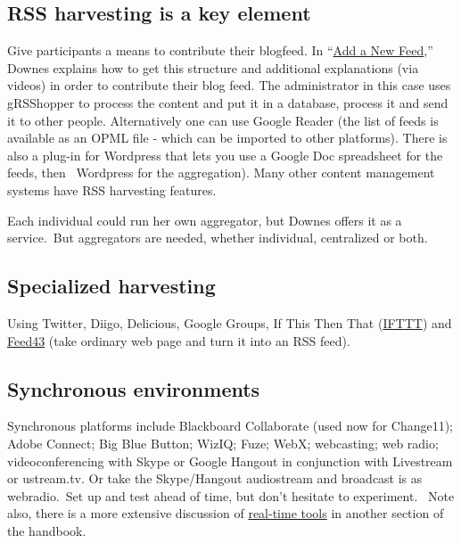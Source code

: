 \hypertarget{rss-harvesting-is-a-key-element}{%
\subsection{RSS harvesting is a key
element}\label{rss-harvesting-is-a-key-element}}

Give participants a means to contribute their blogfeed. In
``\href{http://change.mooc.ca/new_feed.htm}{Add a New Feed},'' Downes
explains how to get this structure and additional explanations (via
videos) in order to contribute their blog feed. The administrator in
this case uses gRSShopper to process the content and put it in a
database, process it and send it to other people. Alternatively one can
use Google Reader (the list of feeds is available as an OPML file -
which can be imported to other platforms). There is also a plug-in for
Wordpress that lets you use a Google Doc spreadsheet for the feeds, then
~Wordpress for the aggregation). Many other content management systems
have RSS harvesting features.

Each individual could run her own aggregator, but Downes offers it as a
service.~But aggregators are needed, whether individual, centralized or
both.

\hypertarget{specialized-harvesting}{%
\subsection{Specialized harvesting}\label{specialized-harvesting}}

Using Twitter, Diigo, Delicious, Google Groups, If This Then That
(\href{http://ifttt.com}{IFTTT}) and \href{http://feed43.com}{Feed43}
(take ordinary web page and turn it into an RSS feed).

\hypertarget{synchronous-environments}{%
\subsection{Synchronous
environments}\label{synchronous-environments}}

Synchronous platforms include Blackboard Collaborate (used now for
Change11); Adobe Connect; Big Blue Button; WizIQ; Fuze; WebX;
webcasting; web radio; videoconferencing with Skype or Google Hangout in
conjunction with Livestream or ustream.tv. Or take the Skype/Hangout
audiostream and broadcast is as webradio.~Set up and test ahead of time,
but don't hesitate to experiment.~ Note also, there is a more extensive
discussion of \href{http://peeragogy.org/real-time-meetings/}{real-time
tools} in another section of the handbook.

